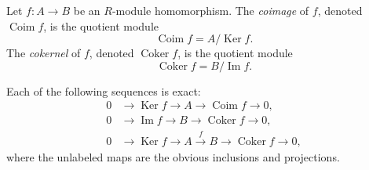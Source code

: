 Let $f: A \to B$ be an $R$-module homomorphism. The \emph{coimage} of $f$, denoted $\operatorname{Coim} f$, is the quotient module
\[
\operatorname{Coim} f = A / \operatorname{Ker} f.
\]
The \emph{cokernel} of $f$, denoted $\operatorname{Coker} f$, is the quotient module
\[
\operatorname{Coker} f = B / \operatorname{Im} f.
\]

Each of the following sequences is exact:
\begin{align*}
0 &\to \operatorname{Ker} f \to A \to \operatorname{Coim} f \to 0,\\
0 &\to \operatorname{Im} f \to B \to \operatorname{Coker} f \to 0,\\
0 &\to \operatorname{Ker} f \to A \xrightarrow{f} B \to \operatorname{Coker} f \to 0,
\end{align*}
where the unlabeled maps are the obvious inclusions and projections.
